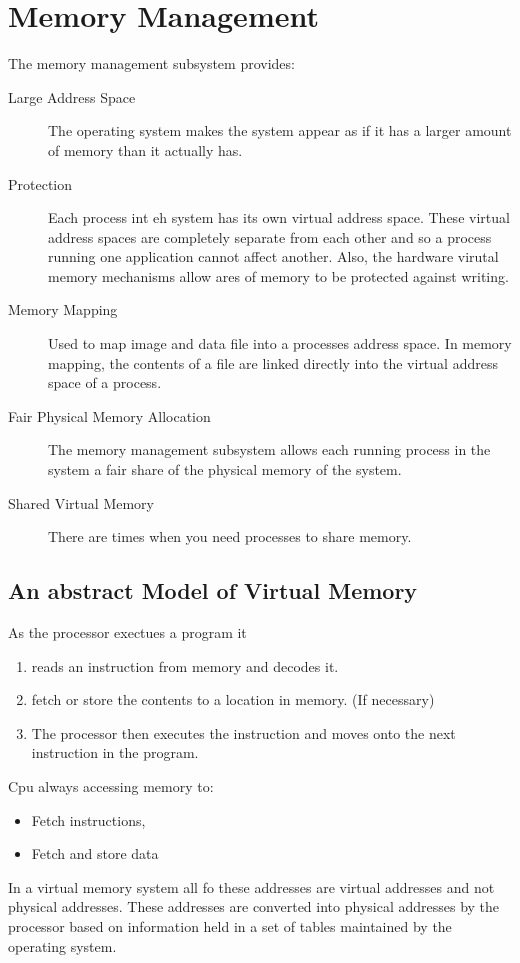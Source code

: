 \documentclass[a4paper,12pt]{book}
\begin{document}
\chapter{Memory Management}
The memory management subsystem provides:
\begin{description}
\item[Large Address Space] The operating system makes the system appear as if it
has a larger amount of memory than it actually has. 
\item[Protection] Each process int eh system has its own virtual address space.
These virtual address spaces are completely separate from each other and so a
process running one application cannot affect another. Also, the hardware
virutal memory mechanisms allow ares of memory to be protected against writing.
\item[Memory Mapping] Used to map image and data file into a processes address
space. In memory mapping, the contents of a file are linked directly into the
virtual address space of a process.
\item[Fair Physical Memory Allocation] The memory management subsystem allows
each running process in the system a fair share of the physical memory of the
system.
\item[Shared Virtual Memory]
There are times when you need processes to share memory.
\end{description}
\section{An abstract Model of Virtual Memory}
As the processor exectues a program it 
\begin{enumerate}
\item reads an instruction from memory and decodes it. 
\item fetch or store the contents to a location in memory. (If necessary)
\item The processor then executes the instruction and moves onto
the next instruction in the program. 
\end{enumerate}
Cpu always accessing memory to:
\begin{itemize}
\item Fetch instructions,
\item Fetch and store data
\end{itemize}

In a virtual memory system all fo these addresses are virtual addresses and not
physical addresses. These addresses are converted into physical addresses by the
processor based on information held in a set of tables maintained by the
operating system.
\end{document}
